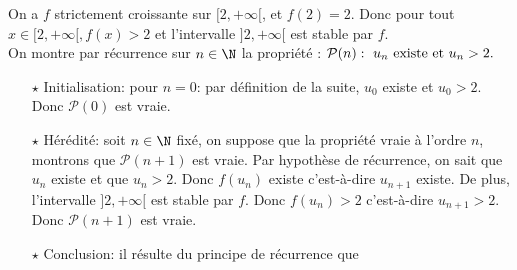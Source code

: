 \begin{correction}
\begin{enumerate}
\begin{enumerate}
On a $f$ strictement croissante sur $[2,+\infty[$, et $f(2) =2$. Donc pour tout $x \in [2,+\infty[, f(x) > 2$ et l'intervalle  $\rbrack 2,+\infty\lbrack$ est stable par $f$.\\
On montre par r\'ecurrence sur $n\in\N$ la propri\'et\'e : $\mathcal{P}(n):\ u_n\ \hbox{existe et}\ u_n>2.$
\begin{itemize}
\item[$\star$] Initialisation: pour $n=0$: par d\'efinition de la suite, $u_0$ existe et $u_0>2$. Donc $\mathcal{P}(0)$ est vraie.
\item[$\star$] H\'er\'edit\'e: soit $n\in\N$ fix\'e, on suppose que la propri\'et\'e vraie \`{a} l'ordre $n$, montrons que $\mathcal{P}(n+1)$ est vraie. Par hypoth\`{e}se de r\'ecurrence, on sait que $u_n$ existe et que $u_n>2$. Donc $f(u_n)$ existe c'est-\`{a}-dire $u_{n+1}$ existe. De plus, l'intervalle $\rbrack 2,+\infty\lbrack$ est stable par $f$. Donc $f(u_n)>2$ c'est-\`{a}-dire $u_{n+1}>2$.
Donc $\mathcal{P}(n+1)$ est vraie.
\item[$\star$] Conclusion: il r\'esulte du principe de r\'ecurrence que


\end{itemize}
\end{enumerate}
\end{enumerate}
\end{correction}
